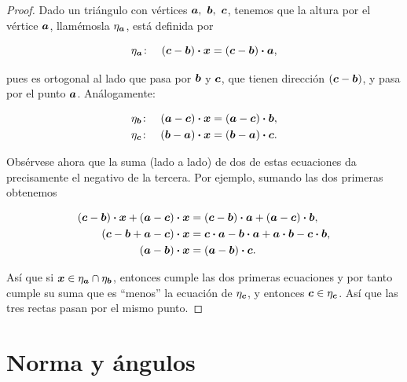 \documentclass{article}
\theoremstyle{definicion}
\theoremstyle{definition}             %
\theoremstyle{definition}             %
\theoremstyle{definition}
\theoremstyle{definition}
\theoremstyle{observacion}
\theoremstyle{definition}
\theoremstyle{plain}
\theoremstyle{definition}
\theoremstyle{afirmacion}
\theoremstyle{notation}
\theoremstyle{definition}
\begin{document}
        \begin{proof}
            Dado un triángulo con vértices \(\vb*{a},\ \vb*{b},\ \vb*{c}\), tenemos que la altura por el vértice \(\vb*{a}\), llamémosla \(\eta_{\vb*{a}}\), está definida por

            \begin{equation*}
                \eta_{\vb*{a}} \colon\quad (\vb*{c} - \vb*{b}) \vdot \vb*{x} = (\vb*{c} - \vb*{b}) \vdot \vb*{a},
            \end{equation*}
            
            pues es ortogonal al lado que pasa por \(\vb*{b}\) y \(\vb*{c}\), que tienen dirección \((\vb*{c} - \vb*{b})\), y pasa por el punto \(\vb*{a}\). Análogamente:

            \begin{align*}
                \eta_{\vb*{b}} \colon\quad (\vb*{a} - \vb*{c}) \vdot \vb*{x} &= (\vb*{a} - \vb*{c}) \vdot \vb*{b},\\
                \eta_{\vb*{c}} \colon\quad (\vb*{b} - \vb*{a}) \vdot \vb*{x} &= (\vb*{b} - \vb*{a}) \vdot \vb*{c}.
            \end{align*}

            Obsérvese ahora que la suma (lado a lado) de dos de estas ecuaciones da precisamente el negativo de la tercera. Por ejemplo, sumando las dos primeras obtenemos

            \begin{align*}
                (\vb*{c} - \vb*{b}) \vdot \vb*{x} + (\vb*{a} - \vb*{c}) \vdot \vb*{x} &= (\vb*{c} - \vb*{b}) \vdot \vb*{a} + (\vb*{a} - \vb*{c}) \vdot \vb*{b},\\
                (\vb*{c} - \vb*{b} + \vb*{a} - \vb*{c}) \vdot \vb*{x} &= \vb*{c} \vdot \vb*{a} - \vb*{b} \vdot \vb*{a} + \vb*{a} \vdot \vb*{b} - \vb*{c} \vdot \vb*{b},\\
                (\vb*{a} - \vb*{b}) \vdot \vb*{x} &= (\vb*{a} - \vb*{b}) \vdot \vb*{c}.
            \end{align*}

            Así que si \(\vb*{x} \in \eta_{\vb*{a}} \cap \eta_{\vb*{b}}\), entonces cumple las dos primeras ecuaciones y por tanto cumple su suma que es ``menos'' la ecuación de \(\eta_{\vb*{c}}\), y entonces \(\vb*{c} \in \eta_{\vb*{c}}\). Así que las tres rectas pasan por el mismo punto.
        \end{proof}

        \section{Norma y ángulos}
\end{document}

